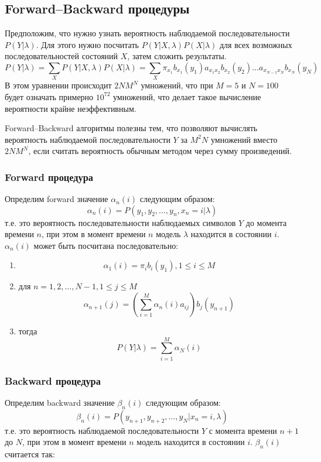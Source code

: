 \documentclass[]{article}
\begin{document}
		\subsection{Forward--Backward процедуры}
			Предположим, что нужно узнать вероятность наблюдаемой последовательности $P(Y|\lambda)$. Для этого нужно посчитать $P(Y|X,\lambda)P(X|\lambda)$ для всех возможных последовательностей состояний $X$, затем сложить результаты.
			\[
				P(Y|\lambda) = \sum_{X}{P(Y|X,\lambda)P(X|\lambda)} = \sum_{X}{\pi_{x_{1}}b_{x_{1}}(y_{1})a_{x_{1}x_{2}}b_{x_{2}}(y_{2}) \dots a_{x_{N-1}x_{N}}b_{x_{N}}(y_{N})}
			\]
			В этом уравнении происходит $2NM^N$ умножений, что при $M=5$ и $N=100$ будет означать примерно $10^{72}$ умножений, что делает такое вычисление вероятности крайне неэффективным.
		
			Forward--Backward алгоритмы полезны тем, что позволяют вычислять вероятность наблюдаемой последовательности $Y$ за $M^{2}N$ умножений вместо $2NM^N$, если считать вероятность обычным методом через сумму произведений.
			\subsubsection{Forward процедура}
				Определим forward значение $\alpha_{n}(i)$ следующим образом:
				\[
					\alpha_{n}(i) = P(y_{1}, y_{2}, \dots, y_{n}, x_{n} = i | \lambda)
				\]
				т.е. это вероятность последовательности наблюдаемых символов $Y$ до момента времени $n$, при этом в момент времени $n$ модель $\lambda$ находится в состоянии $i$. $\alpha_{n}(i)$ может быть посчитана последовательно:
				
				\begin{enumerate}
					\item \[
						\alpha_{1}(i) = \pi_{i}b_{i}(y_{1}), 1 \leq i \leq M
					\]
					\item для $n = 1,2,\dots,N-1, 1 \leq j \leq M$
					\[
						\alpha_{n+1}(j) = \left( \sum_{i=1}^{M}{\alpha_{n}(i)a_{ij}} \right) b_{j}(y_{n+1})
					\]
					\item тогда
					\[
						P(Y|\lambda) = \sum_{i=1}^{M}{\alpha_{N}(i)}
					\]
				\end{enumerate}
			\subsubsection{Backward процедура}
				Определим backward значение $\beta_{n}(i)$ следующим образом:
				\[
				\beta_{n}(i) = P(y_{n+1}, y_{n+2}, \dots, y_{N}|x_{n} = i,
				\lambda)
				\]
				т.е. это вероятность наблюдаемой последовательности $Y$ с момента времени $n+1$ до $N$, при этом в момент времени $n$ модель находится в состоянии $i$.  $\beta_{n}(i)$ считается так:
				
\end{document}
